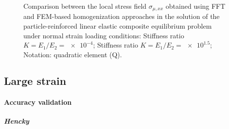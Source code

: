 \begin{figure}[hbt]
\begin{subfigure}[b]{\textwidth}
    \caption{}
    \label{subfig:linear_3D_ratio_-4_normal_stress_11}
  \end{subfigure}
  \caption{Comparison between the local stress field \(\sigma_{\mu,xx}\) obtained using
  FFT and FEM-based homogenization approaches in the solution of the particle-reinforced
  linear elastic composite equilibrium problem under normal strain loading conditions:
   Stiffness ratio \(K=E_1/E_2=\num{e-4}\);
   Stiffness ratio \(K=E_1/E_2=\num{e1.5}\);
  Notation: quadratic element (Q).}
\label{fig:linear_3D_stiff_contrast_normal_stress_11}
\end{figure}


\FloatBarrier

\subsection{Large strain}

\paragraph{Accuracy validation}

\subparagraph{Hencky}


